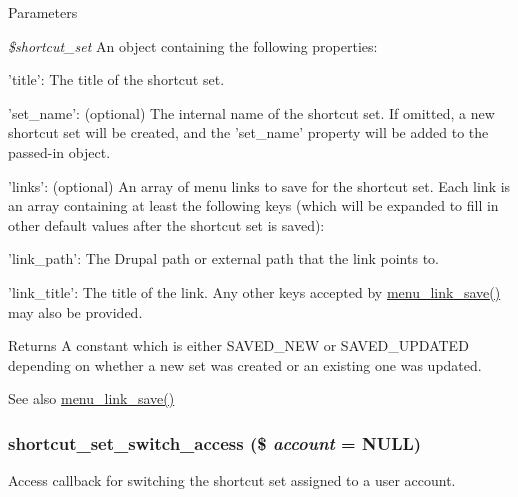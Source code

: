 \begin{DoxyParams}{Parameters}
\item[{\em \$shortcut\_\-set}]An object containing the following properties:
\begin{DoxyItemize}
\item 'title': The title of the shortcut set.
\item 'set\_\-name': (optional) The internal name of the shortcut set. If omitted, a new shortcut set will be created, and the 'set\_\-name' property will be added to the passed-\/in object.
\item 'links': (optional) An array of menu links to save for the shortcut set. Each link is an array containing at least the following keys (which will be expanded to fill in other default values after the shortcut set is saved):
\begin{DoxyItemize}
\item 'link\_\-path': The Drupal path or external path that the link points to.
\item 'link\_\-title': The title of the link. Any other keys accepted by \hyperlink{group__menu_ga133b177fee00b678a19afba18fb81ebc}{menu\_\-link\_\-save()} may also be provided.
\end{DoxyItemize}
\end{DoxyItemize}\end{DoxyParams}
\begin{DoxyReturn}{Returns}
A constant which is either SAVED\_\-NEW or SAVED\_\-UPDATED depending on whether a new set was created or an existing one was updated.
\end{DoxyReturn}
\begin{DoxySeeAlso}{See also}
\hyperlink{group__menu_ga133b177fee00b678a19afba18fb81ebc}{menu\_\-link\_\-save()} 
\end{DoxySeeAlso}
\hypertarget{shortcut_8module_ac3f57b795e5398581e9b92b0b6584193}{
\subsubsection[{shortcut\_\-set\_\-switch\_\-access}]{\setlength{\rightskip}{0pt plus 5cm}shortcut\_\-set\_\-switch\_\-access (\$ {\em account} = {\ttfamily NULL})}}
\label{shortcut_8module_ac3f57b795e5398581e9b92b0b6584193}
Access callback for switching the shortcut set assigned to a user account.


